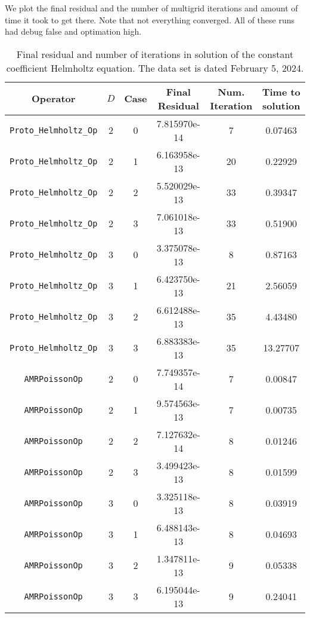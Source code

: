 \documentclass{article}
\begin{document}
We plot the final residual and the  number of multigrid iterations and
amount of time it took to get there. Note that not everything
converged. All of these runs had debug false and optimation high.


\begin{small}
\begin{table}
\begin{center}
\begin{tabular}{|c|c|c|c|c||c|} \hline
 Operator                   & $D$ & Case & Final Residual &
 Num. Iteration & Time to solution\\
\hline
 {\tt Proto\_Helmholtz\_Op}       & 2   & 0    &   7.815970e-14 &         7  & 0.07463  \\
 {\tt Proto\_Helmholtz\_Op}       & 2   & 1    &   6.163958e-13 &         20 & 0.22929  \\
 {\tt Proto\_Helmholtz\_Op}       & 2   & 2    &   5.520029e-13 &         33 & 0.39347  \\
 {\tt Proto\_Helmholtz\_Op}       & 2   & 3    &   7.061018e-13 &         33 & 0.51900  \\
 {\tt Proto\_Helmholtz\_Op}       & 3   & 0    &   3.375078e-13 &         8  & 0.87163  \\
 {\tt Proto\_Helmholtz\_Op}       & 3   & 1    &   6.423750e-13 &         21 & 2.56059  \\
 {\tt Proto\_Helmholtz\_Op}       & 3   & 2    &   6.612488e-13 &         35 & 4.43480  \\
 {\tt Proto\_Helmholtz\_Op}       & 3   & 3    &   6.883383e-13 &         35 & 13.27707 \\
 \hline                                                                       
 {\tt AMRPoissonOp}               & 2   & 0    &   7.749357e-14 &         7  & 0.00847\\
 {\tt AMRPoissonOp}               & 2   & 1    &   9.574563e-13 &         7  & 0.00735\\
 {\tt AMRPoissonOp}               & 2   & 2    &   7.127632e-14 &         8  & 0.01246\\
 {\tt AMRPoissonOp}               & 2   & 3    &   3.499423e-13 &         8  & 0.01599\\
 {\tt AMRPoissonOp}               & 3   & 0    &   3.325118e-13 &         8  & 0.03919\\
 {\tt AMRPoissonOp}               & 3   & 1    &   6.488143e-13 &         8  & 0.04693\\
 {\tt AMRPoissonOp}               & 3   & 2    &   1.347811e-13 &         9  & 0.05338\\
 {\tt AMRPoissonOp}               & 3   & 3    &   6.195044e-13 &         9  & 0.24041\\
\hline
\end{tabular}
\end{center}
\label{tab::helmholtz}
\caption
    {
      Final residual and number of iterations in solution of the  constant
      coefficient Helmholtz equation.
      The data set is dated February 5, 2024.
    }
\end{table}
\end{small}
\end{document}
